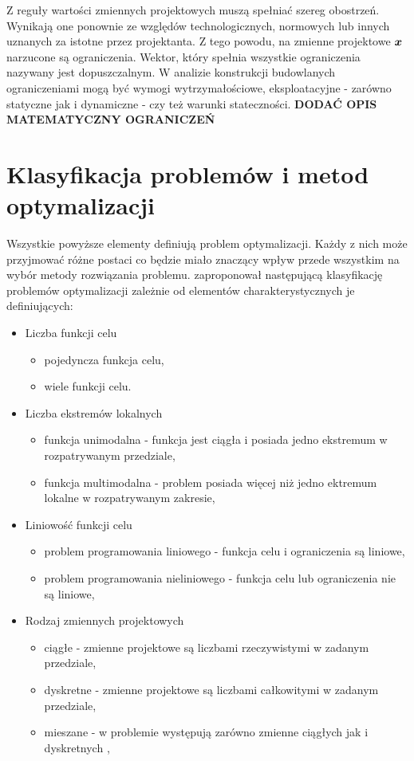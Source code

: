Z reguły wartości zmiennych projektowych muszą spełniać szereg obostrzeń. Wynikają one ponownie ze względów technologicznych, normowych lub innych uznanych za istotne przez projektanta. Z tego powodu, na zmienne projektowe $\bm{x}$ narzucone są ograniczenia. Wektor, który spełnia wszystkie ograniczenia nazywany jest dopuszczalnym. W analizie konstrukcji budowlanych ograniczeniami mogą być wymogi wytrzymałościowe, eksploatacyjne - zarówno statyczne jak i dynamiczne - czy też warunki stateczności. \textbf{DODAĆ OPIS MATEMATYCZNY OGRANICZEŃ}


\section{Klasyfikacja problemów i metod optymalizacji}
Wszystkie powyższe elementy definiują problem optymalizacji. Każdy z nich może przyjmować różne postaci co będzie miało znaczący wpływ przede wszystkim na wybór metody rozwiązania problemu. \cite{Tesch2016} zaproponował następującą klasyfikację problemów optymalizacji zależnie od elementów charakterystycznych je definiujących:
\begin{itemize}[noitemsep]
	\item Liczba funkcji celu
	\begin{itemize}[noitemsep]
		\item pojedyncza funkcja celu,
		\item wiele funkcji celu.
	\end{itemize}
	\item Liczba ekstremów lokalnych
	\begin{itemize}[noitemsep]
		\item funkcja unimodalna - funkcja jest ciągła i posiada jedno ekstremum w rozpatrywanym przedziale,
		\item funkcja multimodalna - problem posiada więcej niż jedno ektremum lokalne w rozpatrywanym zakresie,
	\end{itemize}
	\item Liniowość funkcji celu
	\begin{itemize}[noitemsep]
		\item problem programowania liniowego - funkcja celu i ograniczenia są liniowe,
		\item problem programowania nieliniowego - funkcja celu lub ograniczenia nie są liniowe,
	\end{itemize}
	\item Rodzaj zmiennych projektowych
	\begin{itemize}[noitemsep]
		\item ciągłe - zmienne projektowe są liczbami rzeczywistymi w zadanym przedziale,
		\item dyskretne - zmienne projektowe są liczbami całkowitymi w zadanym przedziale,
		\item mieszane - w problemie występują zarówno zmienne ciągłych jak i dyskretnych ,
	\end{itemize}
\end{itemize}

